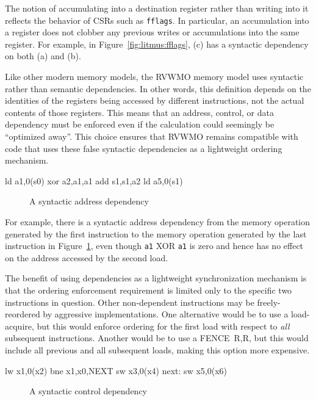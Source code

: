 The notion of accumulating into a destination register rather than writing into it reflects the behavior of CSRs such as {\tt fflags}.
In particular, an accumulation into a register does not clobber any previous writes or accumulations into the same register.
For example, in Figure~\ref{fig:litmus:fflags}, (c) has a syntactic dependency on both (a) and (b).

Like other modern memory models, the RVWMO memory model uses syntactic rather than semantic dependencies.
In other words, this definition depends on the identities of the
registers being accessed by different instructions, not the actual
contents of those registers.  This means that an address, control, or
data dependency must be enforced even if the calculation could seemingly
be ``optimized away''.
This choice ensures that RVWMO remains compatible with code that uses these false syntactic dependencies as a lightweight ordering mechanism.

\begin{verbbox}
ld  a1,0(s0)
xor a2,a1,a1
add s1,s1,a2
ld  a5,0(s1)
\end{verbbox}
\begin{figure}[h!]
  \centering\small
  \theverbbox
  \caption{A syntactic address dependency}
  \label{fig:litmus:address}
\end{figure}

For example, there is a syntactic address
dependency from the memory operation generated by the first instruction to the memory operation generated by the last instruction in
Figure~\ref{fig:litmus:address}, even though {\tt a1} XOR {\tt a1} is zero and
hence has no effect on the address accessed by the second load.

The benefit of using dependencies as a lightweight synchronization mechanism is that the ordering enforcement requirement is limited only to the specific two instructions in question.
Other non-dependent instructions may be freely-reordered by aggressive implementations.
One alternative would be to use a load-acquire, but this would enforce ordering for the first load with respect to {\em all} subsequent instructions.
Another would be to use a FENCE~R,R, but this would include all previous and all subsequent loads, making this option more expensive.

\begin{verbbox}
      lw  x1,0(x2)
      bne x1,x0,NEXT
      sw  x3,0(x4)
next: sw  x5,0(x6)
\end{verbbox}
\begin{figure}[h!]
  \centering\small
  \theverbbox
  \caption{A syntactic control dependency}
  \label{fig:litmus:control1}
\end{figure}

